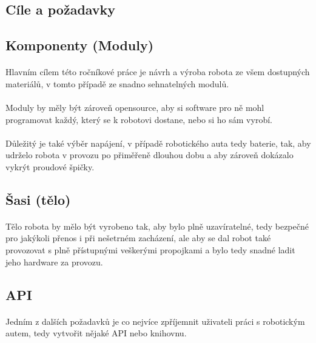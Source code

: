 \documentclass[12pt]{article}
\begin{document}
\begin{spacing}{1.5}
	\newpage
	\section{Cíle a požadavky}
	
	\subsection{Komponenty (Moduly)}
	\paragraph{} Hlavním cílem této ročníkové práce je návrh a výroba robota ze všem dostupných materiálů, v tomto případě ze snadno sehnatelných modulů.
	\paragraph{} Moduly by měly být zároveň opensource, aby si software pro ně mohl programovat každý, který se k robotovi dostane, nebo si ho sám vyrobí.
	\paragraph{} Důležitý je také výběr napájení, v případě robotického auta tedy baterie, tak, aby udrželo robota v provozu po přiměřeně dlouhou dobu a aby zároveň dokázalo vykrýt proudové špičky.
	
	\subsection{Šasi (tělo)}
	\paragraph{} Tělo robota by mělo být vyrobeno tak, aby bylo plně uzavíratelné, tedy bezpečné pro jakýkoli přenos i při nešetrném zacházení, ale aby se dal robot také provozovat s plně přístupnými veškerými propojkami a bylo tedy snadné ladit jeho hardware za provozu.
	
	\subsection{API}
	\paragraph{} Jedním z dalších požadavků je co nejvíce zpříjemnit uživateli práci s robotickým autem, tedy vytvořit nějaké API nebo knihovnu.

\end{spacing}
\end{document}
